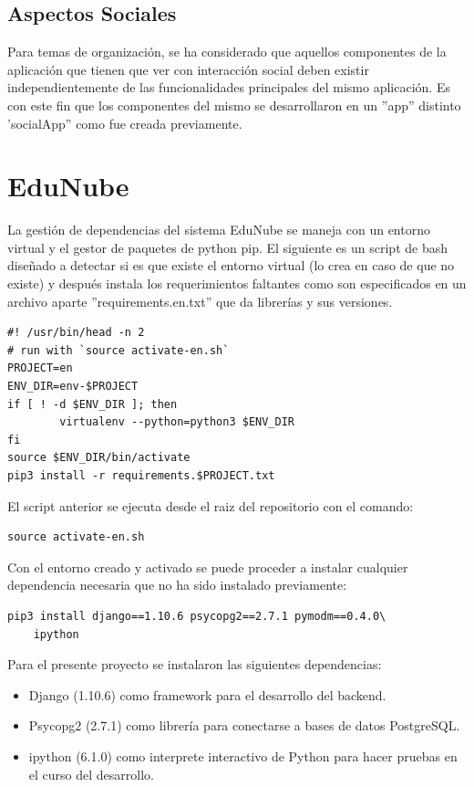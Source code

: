 \subsection{Aspectos Sociales}
Para temas de organización, se ha considerado que aquellos componentes de la aplicación que tienen que ver con interacción social deben existir independientemente de las funcionalidades principales del mismo aplicación. Es con este fin que los componentes del mismo se desarrollaron en un ''app'' distinto 'socialApp'' como fue creada previamente.


\section{EduNube}


La gestión de dependencias del sistema EduNube se maneja con un entorno virtual y el gestor de paquetes de python pip. El siguiente es un script de bash diseñado a detectar si es que existe el entorno virtual (lo crea en caso de que no existe) y después instala los requerimientos faltantes como son especificados en un archivo aparte ''requirements.en.txt'' que da librerías y sus versiones.

\begin{lstlisting}
#! /usr/bin/head -n 2
# run with `source activate-en.sh`
PROJECT=en
ENV_DIR=env-$PROJECT
if [ ! -d $ENV_DIR ]; then
        virtualenv --python=python3 $ENV_DIR
fi
source $ENV_DIR/bin/activate
pip3 install -r requirements.$PROJECT.txt
\end{lstlisting}

El script anterior se ejecuta desde el raiz del repositorio con el comando:

\begin{lstlisting}
source activate-en.sh
\end{lstlisting}

Con el entorno creado y activado se puede proceder a instalar cualquier dependencia necesaria que no ha sido instalado previamente:

\begin{lstlisting}
pip3 install django==1.10.6 psycopg2==2.7.1 pymodm==0.4.0\
	ipython
\end{lstlisting}

Para el presente proyecto se instalaron las siguientes dependencias:
\begin{itemize}
	\item Django (1.10.6) como framework para el desarrollo del backend.
    \item Psycopg2 (2.7.1) como librería para conectarse a bases de datos PostgreSQL.
    \item ipython (6.1.0) como interprete interactivo de Python para hacer pruebas en el curso del desarrollo.
\end{itemize}

